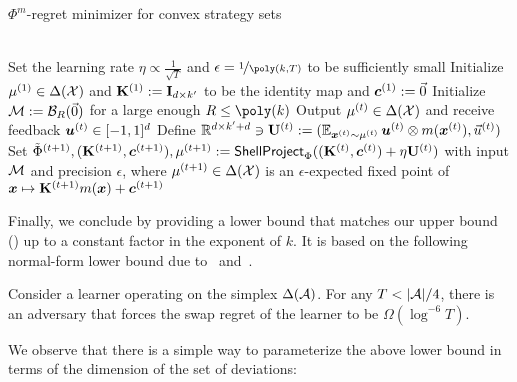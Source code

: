 \begin{algorithm}[!ht]
\caption{$\Phi^m$-regret minimizer for convex strategy sets}
\label{alg:main}
\\
Set the learning rate $\eta \propto \frac{1}{\sqrt{T}}$ and $\epsilon = \nicefrac{1}{\poly(k,T)}$ to be sufficiently small\;
Initialize $\mu^{(1)} \in \Delta({\mathcal{X}})$ and ${\mathbf{K}}^{(1)} := {\mathbf{I}}_{d \times k'}$ to be the identity map and $\bm{c}^{(1)} := \vec{0}$\;
Initialize ${\mathcal{M}} := {\mathcal{B}}_{R}(\vec{0})$ for a large enough $R \leq \poly(k)$\;
  {
    Output $\mu^{(t)} \in \Delta({\mathcal{X}})$ and receive feedback ${\bm{u}}^{(t)} \in [-1, 1]^d$\;
    Define $\mathbb R^{d \times k' + d} \ni {\mathbf{U}}^{(t)} := (\operatorname*{\mathbb E}_{{\bm{x}}^{(t)} \sim \mu^{(t)}} {\bm{u}}^{(t)} \otimes m({\bm{x}}^{(t)}), \vec{u}^{(t)})$\;
    Set $\tilde{\Phi}^{(t+1)}, ({\mathbf{K}}^{(t+1)}, \bm{c}^{(t+1)}), \mu^{(t+1)} := \textsf{ShellProject}_{\Phi}(({\mathbf{K}}^{(t)}, \bm{c}^{(t)}) + \eta {\mathbf{U}}^{(t)})$ with input ${\mathcal{M}}$ and precision $\epsilon$, where $\mu^{(t+1)} \in \Delta({\mathcal{X}})$ is an $\epsilon$-expected fixed point of ${\bm{x}} \mapsto {\mathbf{K}}^{(t+1)} m({\bm{x}}) + \bm{c}^{(t+1)}$ 
 }
\end{algorithm}

Finally, we conclude by providing a lower bound that matches our upper bound () up to a constant factor in the exponent of $k$. It is based on the following normal-form lower bound due to~\citet{Dagan24:From} and~\citet{Peng24:Fast}.

\begin{theorem}
    \label{theorem:lowerknown}
    Consider a learner operating on the simplex $\Delta({\mathcal{A}})$. For any $T < |{\mathcal{A}}|/4$, there is an adversary that forces the swap regret of the learner to be $\Omega(\log^{-6}T)$.
\end{theorem}

We observe that there is a simple way to parameterize the above lower bound in terms of the dimension of the set of deviations:

